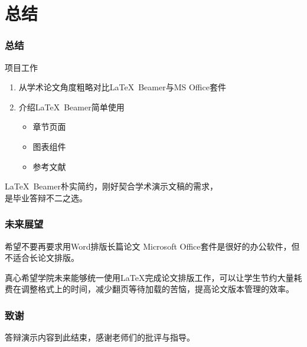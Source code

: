\section[总结]{总结}

\begin{frame}
    \frametitle{总结}
    \begin{block}{项目工作}
        \begin{enumerate}
            \item 从学术论文角度粗略对比\LaTeX \, Beamer与MS Office套件
            \item 介绍\LaTeX \, Beamer简单使用
            \begin{itemize}
                \item 章节页面
                \item 图表组件
                \item 参考文献
            \end{itemize}
        \end{enumerate}
    \end{block}
    \LaTeX \, Beamer朴实简约，刚好契合学术演示文稿的需求，\\是毕业答辩不二之选。
\end{frame}

\begin{frame}
    \frametitle{未来展望}
    \begin{alertblock}{希望不要再要求用Word排版长篇论文}
        Microsoft Office套件是很好的办公软件，但不适合长论文排版。
    \end{alertblock}
    真心希望学院未来能够统一使用\LaTeX 完成论文排版工作，可以让学生节约大量耗费在调整格式上的时间，减少翻页等待加载的苦恼，提高论文版本管理的效率。
    \newline
\end{frame}

\begin{frame}
    \frametitle{致谢}
    \centering
    答辩演示内容到此结束，感谢老师们的批评与指导。
\end{frame}
